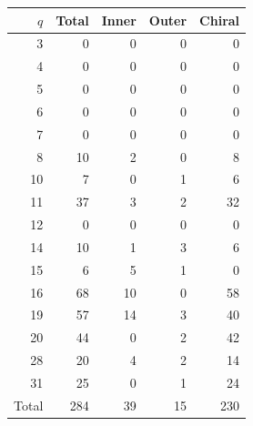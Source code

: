 \begin{center}\begin{tabular}{rrrrr}\toprule
$q$&Total&Inner&Outer&Chiral\\\midrule
3&0&0&0&0\\
4&0&0&0&0\\
5&0&0&0&0\\
6&0&0&0&0\\
7&0&0&0&0\\
8&10&2&0&8\\
10&7&0&1&6\\
11&37&3&2&32\\
12&0&0&0&0\\
14&10&1&3&6\\
15&6&5&1&0\\
16&68&10&0&58\\
19&57&14&3&40\\
20&44&0&2&42\\
28&20&4&2&14\\
31&25&0&1&24\\
\midrule
Total&284&39&15&230\\
\bottomrule\end{tabular}\end{center}
